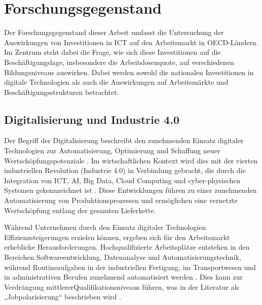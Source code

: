 
\section{Forschungsgegenstand}

Der Forschungsgegenstand dieser Arbeit umfasst die Untersuchung der Auswirkungen von 
Investitionen in \ac{ICT} auf den Arbeitsmarkt in \ac{OECD}-Ländern. Im Zentrum steht 
dabei die Frage, wie sich diese Investitionen auf die Beschäftigungslage, insbesondere 
die Arbeitslosenquote, auf verschiedenen Bildungsniveaus auswirken. Dabei werden 
sowohl die nationalen Investitionen in digitale Technologien als auch die Auswirkungen 
auf Arbeitsmärkte und Beschäftigungsstrukturen betrachtet. 


\subsection{Digitalisierung und Industrie 4.0}

Der Begriff der Digitalisierung beschreibt den zunehmenden Einsatz digitaler 
Technologien zur Automatisierung, Optimierung und Schaffung neuer 
Wertschöpfungspotenziale \parencite[vgl.][S. 6]{brennen2016theinternational}. Im 
wirtschaftlichen Kontext wird dies mit der vierten industriellen Revolution 
(Industrie 4.0) in Verbindung gebracht, die durch die Integration von \ac{ICT}, 
\ac{AI}, Big Data, Cloud Computing und cyber-physischen Systemen gekennzeichnet ist 
\parencite[vgl.][S. 13–14]{kagermann2013recommendations}. Diese Entwicklungen führen 
zu einer zunehmenden Automatisierung von Produktionsprozessen und ermöglichen eine 
vernetzte Wertschöpfung entlang der gesamten Lieferkette. 

Während Unternehmen durch den Einsatz digitaler Technologien Effizienzsteigerungen 
erzielen können, ergeben sich für den Arbeitsmarkt erhebliche Herausforderungen. 
Hochqualifizierte Arbeitsplätze entstehen in den Bereichen Softwareentwicklung, 
Datenanalyse und Automatisierungstechnik, während Routineaufgaben in der industriellen 
Fertigung, im Transportwesen und in administrativen Berufen zunehmend automatisiert 
werden \parencite[vgl.][S. 36–38]{frey2013thefuture}. Dies kann zur Verdrängung 
mittlererQualifikationsniveaus führen, was in der Literatur als „Jobpolarisierung“ 
beschrieben wird \parencite[vgl.][S. 1070]{acemoglu2011skills}. 

